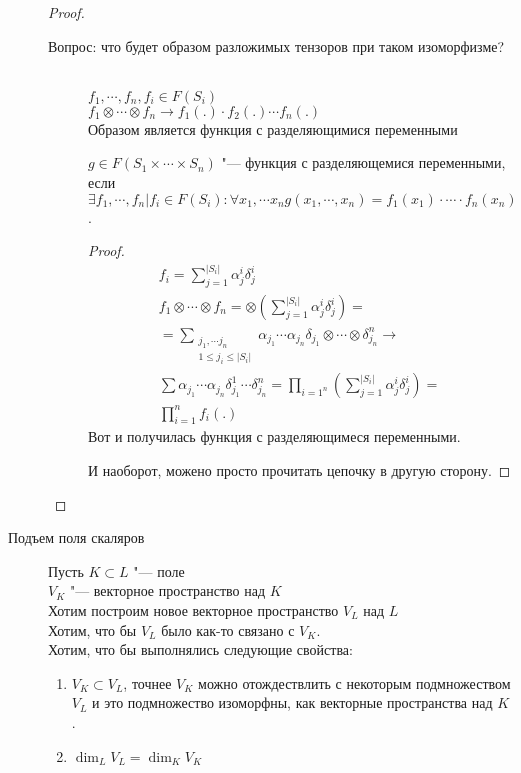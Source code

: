 \begin{description}
\begin{proof}
\begin{description}
    \item [Вопрос: что будет образом разложимых тензоров при таком изоморфизме?] \hfill \\
    $f_1, \cdots, f_n, f_i \in F(S_i)$\\
    $f_1 \otimes \cdots \otimes f_n \to f_1(.) \cdot f_2(.) \cdots f_n(.)$\\
    Образом является функция с разделяющимися переменными
    \begin{Def}
    $g \in F(S_1 \times \cdots \times S_n)$ "--- функция с разделяющемися переменными, если
    $\exists f_1, \cdots, f_n| f_i \in F(S_i) \colon \forall x_1, \cdots x_n g(x_1, \cdots, x_n)  = f_1(x_1)\cdot \cdots \cdot f_n(x_n)$.
    \end{Def}
    \begin{proof}
		\begin{gather*}
			f_i = \sum_{j = 1}^{|S_i|}\alpha_j^i\delta_j^i \\
			f_1 \otimes \cdots \otimes f_n = \otimes(\sum_{j = 1}^{|S_i|}\alpha_j^i\delta_j^i) = \\
			= \sum_{\substack{j_1, \cdots j_n \\ 1\le j_i \le |S_i|}}\alpha_{j_1}\cdots \alpha_{j_n}\delta_{j_1} \otimes \cdots \otimes \delta_{j_n}^n \to \\
    \sum \alpha_{j_1}\cdots \alpha_{j_n} \delta_{j_1}^1 \cdots \delta_{j_n}^n = \prod_{i = 1^n}(\sum_{j = 1}^{|S_i|}\alpha_j^i\delta_j^i) =\\
    	\prod_{i = 1}^{n}f_i(.)
	\end{gather*}
    Вот и получилась функция с разделяющимеся переменными.

    И наоборот, можено просто прочитать цепочку в другую сторону.
    \end{proof}
    \end{description}
    \end{proof}
\item [Подъем поля скаляров]
Пусть $K \subset L$ "--- поле\\
$V_K$ "--- векторное пространство над $K$\\

Хотим построим новое векторное пространство $V_L$ над $L$\\
Хотим, что бы $V_L$ было как-то связано с $V_K$.\\
Хотим, что бы выполнялись следующие свойства:
\begin{enumerate}
\item $V_K \subset V_L$, точнее $V_K$ можно отождествлить 
с некоторым подмножеством $V_L$ и это подмножество изоморфны, как 
векторные пространства над $K$.
\item $\dim_L V_L = \dim_K V_K$
\end{enumerate}


\end{description}

